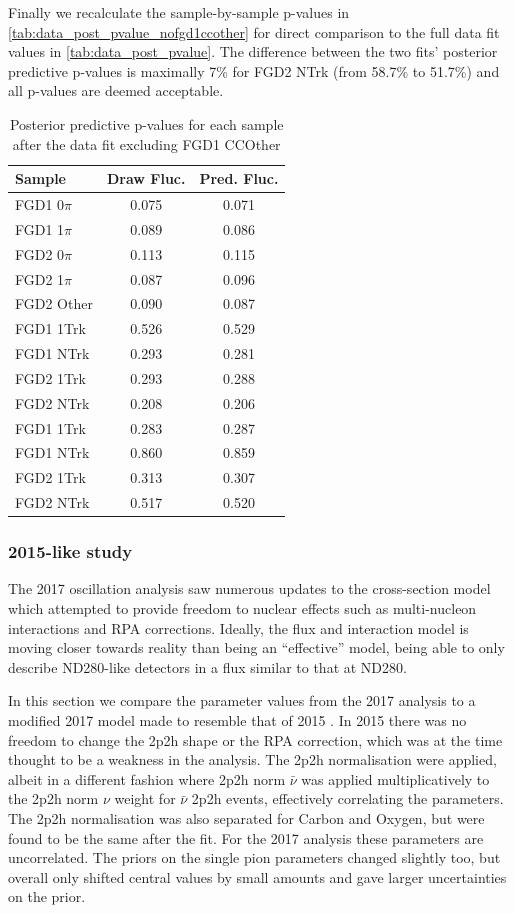 Finally we recalculate the sample-by-sample p-values in \autoref{tab:data_post_pvalue_nofgd1ccother} for direct comparison to the full data fit values in \autoref{tab:data_post_pvalue}. The difference between the two fits' posterior predictive p-values is maximally 7\% for FGD2 NTrk (from 58.7\% to 51.7\%) and all p-values are deemed acceptable.
\begin{table}[h]
	\centering
	\begin{tabular}{l | c c }
		\hline \hline
		Sample & Draw Fluc. & Pred. Fluc. \\
		\hline
		FGD1 0$\pi$ & 0.075 & 0.071 \\
		FGD1 1$\pi$ & 0.089 & 0.086 \\
		FGD2 0$\pi$ & 0.113 & 0.115 \\
		FGD2 1$\pi$ & 0.087 & 0.096 \\
		FGD2 Other  & 0.090 & 0.087 \\
		\hline
		FGD1 1Trk & 0.526 & 0.529 \\
		FGD1 NTrk & 0.293 & 0.281 \\
		FGD2 1Trk & 0.293 & 0.288 \\
		FGD2 NTrk & 0.208 & 0.206 \\
		\hline
		FGD1 \numu 1Trk & 0.283 & 0.287 \\
		FGD1 \numu NTrk & 0.860 & 0.859 \\
		FGD2 \numu 1Trk & 0.313 & 0.307 \\
		FGD2 \numu NTrk & 0.517 & 0.520 \\
		\hline
		\hline
	\end{tabular}
	\caption{Posterior predictive p-values for each sample after the data fit excluding FGD1 CCOther}
	\label{tab:data_post_pvalue_nofgd1ccother}
\end{table}

\subsubsection{2015-like study}
The 2017 oscillation analysis saw numerous updates to the cross-section model which attempted to provide freedom to nuclear effects such as multi-nucleon interactions and RPA corrections. Ideally, the flux and interaction model is moving closer towards reality than being an ``effective'' model, being able to only describe ND280-like detectors in a flux similar to that at ND280. 

In this section we compare the parameter values from the 2017 analysis to a modified 2017 model made to resemble that of 2015 . In 2015 there was no freedom to change the 2p2h shape or the RPA correction, which was at the time thought to be a weakness in the analysis. The 2p2h normalisation were applied, albeit in a different fashion where 2p2h norm $\bar{\nu}$ was applied multiplicatively to the 2p2h norm $\nu$ weight for $\bar{\nu}$ 2p2h events, effectively correlating the parameters. The 2p2h normalisation was also separated for Carbon and Oxygen, but were found to be the same after the fit. For the 2017 analysis these parameters are uncorrelated. The priors on the single pion parameters changed slightly too, but overall only shifted central values by small amounts and gave larger uncertainties on the prior.

